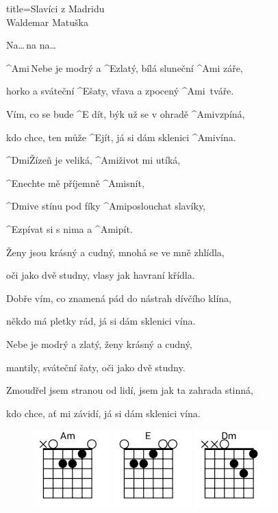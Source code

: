 \begin{song}{title=\predtitle\centering Slavíci z Madridu \\\large Waldemar Matuška \vspace*{-0.3cm}}  %
\begin{centerjustified}

	Na\elipsa\dots\,na na\elipsa\dots

\sloka
	^{Ami\,}Nebe je modrý a ^{E\z}zlatý, bílá sluneční ^{Ami\,\,}záře,

	horko a sváteční ^{E\z}šaty, vřava a zpocený ^{Ami\,\,\,}tváře. 

	Vím, co se bude ^{E\,\,}dít, býk už se v ohradě ^{Ami\z}vzpíná,

	kdo chce, ten může ^{E\z}jít, já si dám sklenici ^{Ami\z}vína.

	^{Dmi\z}Žízeň je veliká, ^{Ami\z}život mi utíká,

	^{E\z}nechte mě příjemně ^{Ami\z}snít,

	^{Dmi}ve stínu pod fíky ^{Ami\z}poslouchat slavíky,

	^{E\z}zpívat si s nima a ^{Ami\z}pít.\:\:\:\:\:

\sloka
	Ženy jsou krásný a cudný, mnohá se ve mně zhlídla,

	oči jako dvě studny, vlasy jak havraní křídla.

	Dobře vím, co znamená pád do nástrah dívčího klína,

	někdo má pletky rád, já si dám sklenici vína.


\sloka
	Nebe je modrý a zlatý, ženy krásný a cudný,

	mantily, sváteční šaty, oči jako dvě studny.

	Zmoudřel jsem stranou od lidí, jsem jak ta zahrada stinná,

	kdo chce, ať mi závidí, já si dám sklenici vína.
	


\end{centerjustified}
\setcounter{Slokočet}{0}
\end{song}
\begin{figure}[h]
\predtitle\centering
\includegraphics[width=3cm]{../Akordy/am}
\includegraphics[width=3cm]{../Akordy/e}
\includegraphics[width=3cm]{../Akordy/dm}
\end{figure}
